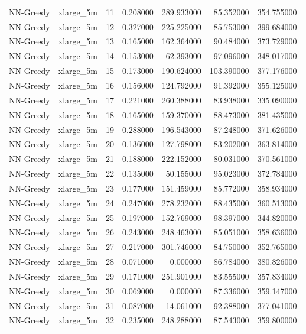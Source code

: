 \begin{tabular}{llrrrrr}
NN-Greedy & xlarge_5m & 11 & 0.208000 & 289.933000 & 85.352000 & 354.755000 \\
NN-Greedy & xlarge_5m & 12 & 0.327000 & 225.225000 & 85.753000 & 399.684000 \\
NN-Greedy & xlarge_5m & 13 & 0.165000 & 162.364000 & 90.484000 & 373.729000 \\
NN-Greedy & xlarge_5m & 14 & 0.153000 & 62.393000 & 97.096000 & 348.017000 \\
NN-Greedy & xlarge_5m & 15 & 0.173000 & 190.624000 & 103.390000 & 377.176000 \\
NN-Greedy & xlarge_5m & 16 & 0.156000 & 124.792000 & 91.392000 & 355.125000 \\
NN-Greedy & xlarge_5m & 17 & 0.221000 & 260.388000 & 83.938000 & 335.090000 \\
NN-Greedy & xlarge_5m & 18 & 0.165000 & 159.370000 & 88.473000 & 381.435000 \\
NN-Greedy & xlarge_5m & 19 & 0.288000 & 196.543000 & 87.248000 & 371.626000 \\
NN-Greedy & xlarge_5m & 20 & 0.136000 & 127.798000 & 83.202000 & 363.814000 \\
NN-Greedy & xlarge_5m & 21 & 0.188000 & 222.152000 & 80.031000 & 370.561000 \\
NN-Greedy & xlarge_5m & 22 & 0.135000 & 50.155000 & 95.023000 & 372.784000 \\
NN-Greedy & xlarge_5m & 23 & 0.177000 & 151.459000 & 85.772000 & 358.934000 \\
NN-Greedy & xlarge_5m & 24 & 0.247000 & 278.232000 & 88.435000 & 360.513000 \\
NN-Greedy & xlarge_5m & 25 & 0.197000 & 152.769000 & 98.397000 & 344.820000 \\
NN-Greedy & xlarge_5m & 26 & 0.243000 & 248.463000 & 85.051000 & 358.636000 \\
NN-Greedy & xlarge_5m & 27 & 0.217000 & 301.746000 & 84.750000 & 352.765000 \\
NN-Greedy & xlarge_5m & 28 & 0.071000 & 0.000000 & 86.784000 & 380.826000 \\
NN-Greedy & xlarge_5m & 29 & 0.171000 & 251.901000 & 83.555000 & 357.834000 \\
NN-Greedy & xlarge_5m & 30 & 0.069000 & 0.000000 & 87.336000 & 359.147000 \\
NN-Greedy & xlarge_5m & 31 & 0.087000 & 14.061000 & 92.388000 & 377.041000 \\
NN-Greedy & xlarge_5m & 32 & 0.235000 & 248.288000 & 87.543000 & 359.800000 \\

\end{tabular}

